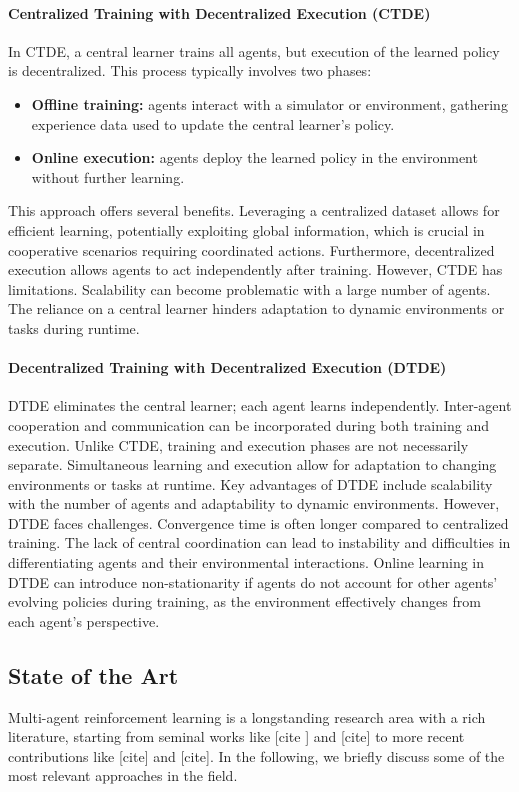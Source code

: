 \documentclass[sigconf]{acmart}
\begin{document}
\paragraph{Centralized Training with Decentralized Execution (CTDE)}
In CTDE, a central learner trains all agents, 
but execution of the learned policy is decentralized. 
This process typically involves two phases:
\begin{itemize}
    \item \textbf{Offline training:} agents interact with a simulator or environment, 
    gathering experience data used to update the central learner's policy.
    \item \textbf{Online execution:} agents deploy the learned policy in the environment without further learning.
\end{itemize}
This approach offers several benefits.  
Leveraging a centralized dataset allows for efficient learning, 
potentially exploiting global information, 
which is crucial in cooperative scenarios requiring coordinated actions. 
Furthermore, decentralized execution allows agents to act independently after training.
%
However, CTDE has limitations. 
Scalability can become problematic with a large number of agents. 
The reliance on a central learner hinders adaptation to dynamic environments or tasks during runtime.
\sloppy
\paragraph{Decentralized Training with Decentralized Execution (DTDE)}
DTDE eliminates the central learner; each agent learns independently. 
Inter-agent cooperation and communication can be incorporated during both training and execution. 
Unlike CTDE, training and execution phases are not necessarily separate. 
Simultaneous learning and execution allow for adaptation to changing environments or tasks at runtime.
%
Key advantages of DTDE include scalability with the number of agents and adaptability to dynamic environments.
%
However, DTDE faces challenges. 
Convergence time is often longer compared to centralized training. 
The lack of central coordination can lead to instability and difficulties in differentiating agents and their environmental interactions. 
Online learning in DTDE can introduce non-stationarity if agents do not account for other agents' evolving policies during training, 
as the environment effectively changes from each agent's perspective.
\subsection{State of the Art}
Multi-agent reinforcement learning is a longstanding research area with a rich literature, starting 
from seminal works like [cite ] and [cite] to more recent contributions like [cite] and [cite].
%
In the following, we briefly discuss some of the most relevant approaches in the field.
\end{document}
